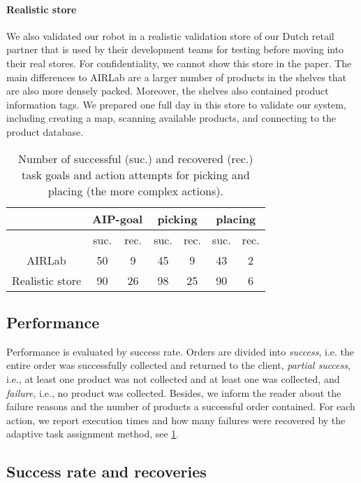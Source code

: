 \paragraph{Realistic store}
We also validated our robot in a realistic validation store of our Dutch retail partner that is used by their development teams for testing before moving into their real stores.  
For confidentiality, we cannot show this store in the paper.
The main differences to AIRLab are a larger number of products in the shelves that are also more densely packed.
Moreover, the shelves also contained product information tags. 
We prepared one full day in this store to validate our system, including creating a map, scanning available products, and connecting to the product database.
\begin{table}[b]
    \centering
    \caption{Number of successful (suc.) and recovered (rec.) task goals and action attempts for picking and placing (the more complex actions). 
    }
    \label{tab:recoveries}
    \begin{tabular}{ccccccc}
        \toprule
         & \multicolumn{2}{c}{AIP-goal} &
        \multicolumn{2}{c}{picking} &
        \multicolumn{2}{c}{placing} \\
        \midrule
        & suc. & rec. & suc. & rec. & suc. & rec. \\
        AIRLab & 50 & 9 & 45 & 9 & 43 & 2 \\
        Realistic store & 90 & 26 & 98 & 25 & 90 & 6 \\
        \bottomrule
    \end{tabular}   
\end{table}
\subsection{Performance}
Performance is  evaluated by success rate. Orders are
divided into \textit{success}, i.e. the entire order was
successfully collected and returned to the client, \textit{partial success}, i.e., at least one product was not collected and at least one was collected,
and \textit{failure},
i.e., no product was collected. Besides, we inform the reader
about the failure reasons and the number of products a
successful order contained. For each action, we 
report execution times and how many 
failures were recovered by the adaptive task assignment
method, see \cref{tab:recoveries}.


\subsection{Success rate and recoveries}



